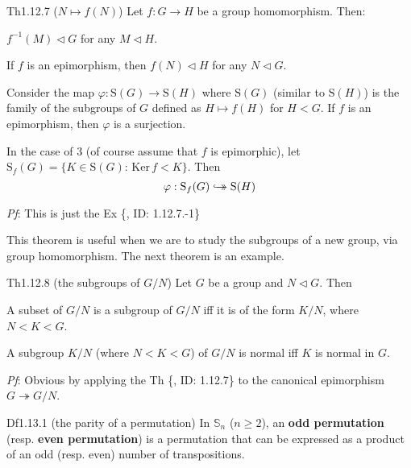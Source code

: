 \documentclass{article}
\newcommand{\nles}{\vartriangleleft}
\newcommand{\Ker}{\text{Ker}\,}
\newcommand{\hooktwoheadrightarrow}{%
        \hookrightarrow\mathrel{\mspace{-15mu}}\rightarrow}
\begin{document}
\begin{Th}{Th1.12.7 ($N\mapsto f(N)$)}
    Let $f: G\to H$ be a group homomorphism. Then:
    \begin{compactenum}
        \item $f^{-1}(M) \nles G$ for any $M\nles H$.
        \item If $f$ is an epimorphism, then $f(N)\nles H$ for any $N\nles G$.
        \item Consider the map $\varphi: \mathrm{S}(G)\to\mathrm{S}(H)$ where $\mathrm{S}(G)$ (similar to $\mathrm{S}(H)$) is the family of the subgroups of $G$ defined as $H\mapsto f(H)$ for $H<G$. If $f$ is an epimorphism, then $\varphi$ is a surjection.
        \item In the case of 3 (of course assume that $f$ is epimorphic), let $\mathrm{S}_f(G) = \{K\in\mathrm{S}(G): \,\Ker f<K\}$. Then 
        $$ \varphi: \mathrm{S}_f(G)\hooktwoheadrightarrow\mathrm{S}(H) $$
    \end{compactenum}
    \tcblower
    \textit{Pf}: This is just the Ex \{, ID: 1.12.7.-1\}
\end{Th}

\begin{Rmk}{}
    This theorem is useful when we are to study the subgroups of a new group, via group homomorphism. The next theorem is an example.
\end{Rmk}

\begin{Th}{Th1.12.8 (the subgroups of $G/N$)}
    Let $G$ be a group and $N\nles G$. Then
    \begin{compactenum}
        \item A subset of $G/N$ is a subgroup of $G/N$ iff it is of the form $K/N$, where $N<K<G$.
        \item A subgroup $K/N$ (where $N<K<G$) of $G/N$ is normal iff $K$ is normal in $G$.
    \end{compactenum}
    \tcblower
    \textit{Pf}: Obvious by applying the Th \{, ID: 1.12.7\} to the canonical epimorphism $G\twoheadrightarrow G/N$.
\end{Th}

\begin{Df}{Df1.13.1 (the parity of a permutation)}
    In $\mathbb{S}_n$ ($n\geq 2$), an \textbf{odd permutation} (resp. \textbf{even permutation}) is a permutation that can be expressed as a product of an odd (resp. even) number of transpositions. 
\end{Df}
\end{document}
